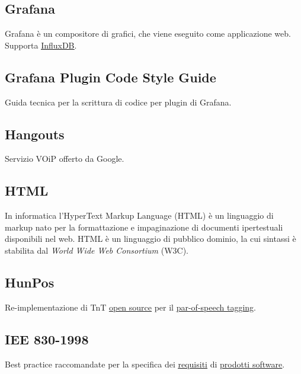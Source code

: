 	\subsection{Grafana}
	\label{sec:grafana}
	Grafana è un compositore di grafici, che viene eseguito come applicazione web. Supporta \underline{\hyperref[sec:influxdb]{InfluxDB}}.

	\subsection{Grafana Plugin Code Style Guide}
	\label{sec:grafana}
	Guida tecnica per la scrittura di codice per plugin di Grafana.	
	\newpage 


	\subsection{Hangouts}
	\label{sec:hangouts}
	Servizio VOiP offerto da Google. 

	\subsection{HTML}
	\label{sec:html}
	In informatica l'HyperText Markup Language (HTML) è un linguaggio di markup  nato per la formattazione e impaginazione di documenti ipertestuali disponibili nel web. HTML è un linguaggio di pubblico dominio, la cui sintassi è stabilita dal \emph{World Wide Web Consortium} (W3C).

	\subsection{HunPos}
	\label{sec:hunpos}
	Re-implementazione di TnT \underline{\hyperref[sec:opensource]{open source}} per il \underline{\hyperref[sec:post]{par-of-speech tagging}}.

	\newpage



	\subsection{IEE 830-1998}
	\label{sec:iee830}
	Best practice raccomandate per la specifica dei \underline{\hyperref[sec:requisito]{requisiti}} di \underline{\hyperref[sec:prodottosoftware]{prodotti software}}.


